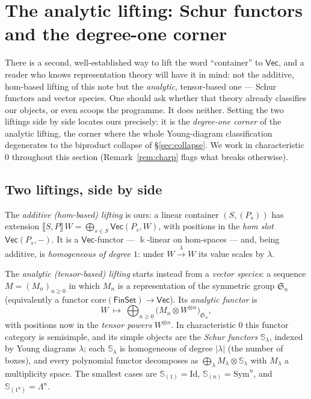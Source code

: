 \documentclass[11pt]{amsart}
\theoremstyle{plain}
\theoremstyle{definition}
\renewcommand{\Vec}{\mathsf{Vec}}
\newcommand{\Id}{\mathrm{Id}}
\newcommand{\ext}[1]{\llbracket #1 \rrbracket}
\newcommand{\fld}{\Bbbk}
\newcommand{\bul}{{-}}
\begin{document}
\section{The analytic lifting: Schur functors and the degree-one corner}\label{sec:schur}

There is a second, well-established way to lift the word ``container'' to
$\Vec$, and a reader who knows representation theory will have it in mind: not
the additive, hom-based lifting of this note but the \emph{analytic},
tensor-based one --- Schur functors and vector species. One should ask whether
that theory already classifies our objects, or even scoops the programme. It
does neither. Setting the two liftings side by side locates ours precisely: it
is the \emph{degree-one corner} of the analytic lifting, the corner where the
whole Young-diagram classification degenerates to the biproduct collapse of
\S\ref{sec:collapse}. We work in characteristic $0$ throughout this section
(Remark~\ref{rem:charp} flags what breaks otherwise).

\subsection{Two liftings, side by side}

The \emph{additive (hom-based) lifting} is ours: a linear container $(S,(P_s))$
has extension $\ext{S,P}\,W=\bigoplus_{s\in S}\Vec(P_s,W)$, with positions in
the \emph{hom slot} $\Vec(P_s,\bul)$. It is a $\Vec$-functor --- $\fld$-linear
on hom-spaces --- and, being additive, is \emph{homogeneous of degree $1$}:
under $W\xrightarrow{\lambda}W$ its value scales by $\lambda$.

The \emph{analytic (tensor-based) lifting} starts instead from a \emph{vector
species}: a sequence $M=(M_n)_{n\ge0}$ in which $M_n$ is a representation of the
symmetric group $\mathfrak S_n$ (equivalently a functor
$\mathrm{core}(\mathsf{FinSet})\to\Vec$). Its \emph{analytic functor} is
\[
  W\ \longmapsto\ \bigoplus_{n\ge0}\bigl(M_n\otimes W^{\otimes n}\bigr)_{\mathfrak S_n},
\]
with positions now in the \emph{tensor powers} $W^{\otimes n}$. In characteristic
$0$ this functor category is semisimple, and its simple objects are the
\emph{Schur functors} $\mathbb S_\lambda$, indexed by Young diagrams $\lambda$;
each $\mathbb S_\lambda$ is homogeneous of degree $|\lambda|$ (the number of
boxes), and every polynomial functor decomposes as
$\bigoplus_\lambda M_\lambda\otimes\mathbb S_\lambda$ with $M_\lambda$ a
multiplicity space. The smallest cases are $\mathbb S_{(1)}=\Id$,
$\mathbb S_{(n)}=\mathrm{Sym}^n$, and $\mathbb S_{(1^n)}=\Lambda^n$.
\end{document}
